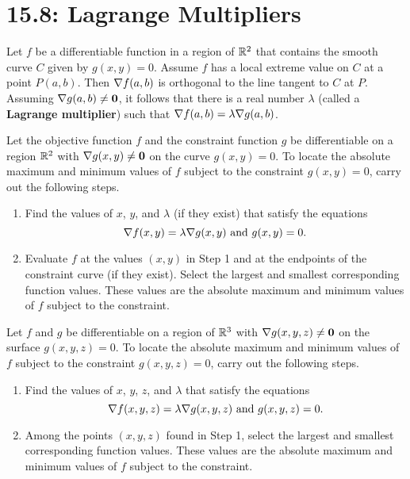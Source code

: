 \documentclass[mathNotesPreamble]{subfiles}
\begin{document}
\section{15.8: Lagrange Multipliers}

  \begin{defn*}
    Let $f$ be a differentiable function in a region of $\mathbb{R}^2$ that contains the smooth curve $C$ given by $g(x,y)=0$. Assume $f$ has a local extreme value on $C$ at a point $P(a,b)$. Then $\nabla f(a,b)$ is orthogonal to the line tangent to $C$ at $P$. Assuming $\nabla g(a,b)\neq \mathbf{0}$, it follows that there is a real number $\lambda$ (called a \textbf{Lagrange multiplier}) such that $\nabla f(a,b)=\lambda \nabla g(a,b)$.
  \end{defn*}

  \begin{thmBox*}
    Let the objective function $f$ and the constraint function $g$ be differentiable on a region $\mathbb{R}^2$ with $\nabla g(x,y)\neq\mathbf{0}$ on the curve $g(x,y)=0$. To locate the absolute maximum and minimum values of $f$ subject to the constraint $g(x,y)=0$, carry out the following steps.
    \begin{enumerate}
      \item 
        Find the values of $x$, $y$, and $\lambda$ (if they exist) that satisfy the equations
          \[\nabla f(x,y)=\lambda \nabla g(x,y) \textnormal{ and } g(x,y)=0.\]
      \item 
        Evaluate $f$ at the values $(x,y)$ in Step 1 and at the endpoints of the constraint curve (if they exist). Select the largest and smallest corresponding function values. These values are the absolute maximum and minimum values of $f$ subject to the constraint.
    \end{enumerate}
  \end{thmBox*}

  \begin{thmBox*}
    Let $f$ and $g$ be differentiable on a region of $\mathbb{R}^3$ with $\nabla g(x,y,z)\neq \mathbf{0}$ on the surface $g(x,y,z)=0$. To locate the absolute maximum and minimum values of $f$ subject to the constraint $g(x,y,z)=0$, carry out the following steps.
    \begin{enumerate}
      \item 
        Find the values of $x$, $y$, $z$, and $\lambda$ that satisfy the equations
          \[\nabla f(x,y,z)=\lambda\nabla g(x,y,z)\textnormal{ and } g(x,y,z)=0.\]
      \item 
        Among the points $(x,y,z)$ found in Step 1, select the largest and smallest corresponding function values. These values are the absolute maximum and minimum values of $f$ subject to the constraint.
    \end{enumerate}
  \end{thmBox*}



  \pagebreak
  
\end{document}
